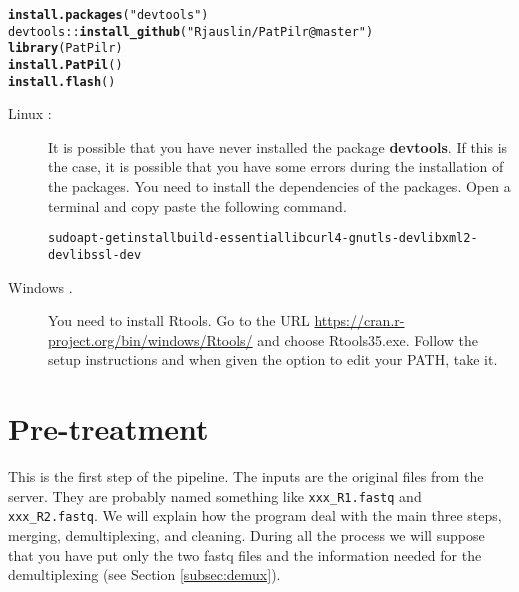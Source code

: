 \documentclass{article}\usepackage[]{graphicx}\usepackage[]{color}
\makeatletter
\newcommand{\hlstr}[1]{\textcolor[rgb]{0.192,0.494,0.8}{#1}}%
\newcommand{\hlopt}[1]{\textcolor[rgb]{0,0,0}{#1}}%
\newcommand{\hlstd}[1]{\textcolor[rgb]{0.345,0.345,0.345}{#1}}%
\newcommand{\hlkwd}[1]{\textcolor[rgb]{0.737,0.353,0.396}{\textbf{#1}}}%
\newenvironment{kframe}{%
 \def\at@end@of@kframe{}%
 \ifinner\ifhmode%
  \def\at@end@of@kframe{\end{minipage}}%
  \begin{minipage}{\columnwidth}%
 \fi\fi%
 \def\FrameCommand##1{\hskip\@totalleftmargin \hskip-\fboxsep
 \colorbox{shadecolor}{##1}\hskip-\fboxsep
     \hskip-\linewidth \hskip-\@totalleftmargin \hskip\columnwidth}%
 \MakeFramed {\advance\hsize-\width
   \@totalleftmargin\z@ \linewidth\hsize
   \@setminipage}}%
 {\par\unskip\endMakeFramed%
 \at@end@of@kframe}
\newenvironment{knitrout}{}{} %
\makeatother
\begin{document}
\begin{knitrout}
\color{fgcolor}\begin{kframe}
\begin{alltt}
\hlkwd{install.packages}\hlstd{(}\hlstr{"devtools"}\hlstd{)}
\hlstd{devtools}\hlopt{::}\hlkwd{install_github}\hlstd{(}\hlstr{"Rjauslin/PatPilr@master"}\hlstd{)}
\hlkwd{library}\hlstd{(PatPilr)}
\hlkwd{install.PatPil}\hlstd{()}
\hlkwd{install.flash}\hlstd{()}
\end{alltt}
\end{kframe}
\end{knitrout}

\begin{description}
	
	\item[Linux :] It is possible that you have never installed the package \textbf{devtools}. If this is the case, it is possible that you have some errors during the installation of the packages. You need to install the dependencies of the packages. Open a terminal and copy paste the following command.
\begin{knitrout}
\color{fgcolor}\begin{kframe}
\begin{alltt}
sudo apt-get install build-essential libcurl4-gnutls-dev libxml2-dev libssl-dev
\end{alltt}
\end{kframe}
\end{knitrout}
	\item[Windows .] You need to install Rtools. Go to the URL \url{https://cran.r-project.org/bin/windows/Rtools/} and choose Rtools35.exe. Follow the setup instructions and when given the option to edit your PATH, take it.
\end{description}


\newpage

\section{Pre-treatment}
\label{sec:pretreatment}
This is the first step of the pipeline. The inputs are the original files from the server. They are probably named something like \texttt{xxx\_R1.fastq} and \texttt{xxx\_R2.fastq}. We will explain how the program deal with the main three steps, merging, demultiplexing, and cleaning. During all the process we will suppose that you have put only the two fastq files and the information needed for the demultiplexing (see Section \ref{subsec:demux}).
\end{document}
